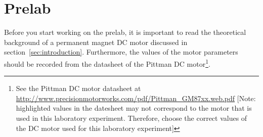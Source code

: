 \section{Prelab}
\label{sec:prelabDC-MotorModeling}
Before you start working on the prelab, it is important to read the theoretical background of a permanent magnet DC motor discussed in section~\ref{sec:introduction}. Furthermore, the values of the motor parameters should be recorded from the datasheet of the Pittman DC motor\footnote{See the Pittman DC motor datasheet at \href{http://www.precisionmotorworks.com/pdf/Pittman_GM87xx.web.pdf}{http://www.precisionmotorworks.com/pdf/Pittman\_GM87xx.web.pdf} [Note: highlighted values in the datesheet may not correspond to the motor that is used in this laboratory experiment. Therefore, choose the correct values of the DC motor used for this laboratory experiment]}. %
%
%
